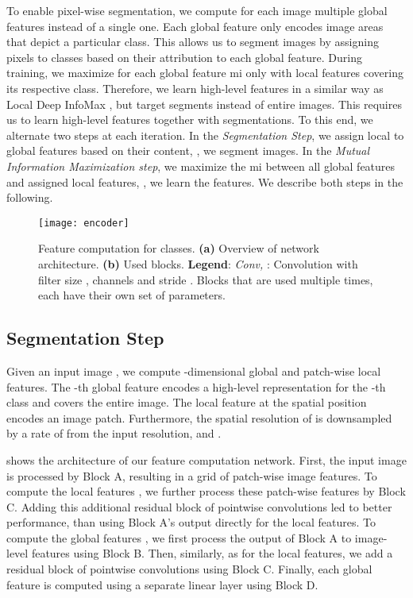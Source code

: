 To enable pixel-wise segmentation, we compute for each image multiple global features instead of a single one.
Each global feature only encodes image areas that depict a particular class.
This allows us to segment images by assigning pixels to classes based on their attribution to each global feature.
During training, we maximize for each global feature \gls{mi} only with local features covering its respective class.
Therefore, we learn high-level features in a similar way as Local Deep InfoMax \cite{deepinfo}, but target segments instead of entire images.
This requires us to learn high-level features together with segmentations.
To this end, we alternate two steps at each iteration.
In the \textit{Segmentation Step}, we assign local to global features based on their content, \ie, we segment images.
In the \textit{Mutual Information Maximization step}, we maximize the \gls{mi} between all global features and assigned local features, \ie, we learn the features.
We describe both steps in the following.





\begin{figure}[t]
	\begin{center}
	\texttt{[image: encoder]}
	\caption{Feature computation for  classes. \textbf{(a)} Overview of network architecture.
		\textbf{(b)} Used blocks. \textbf{Legend}: \textit{Conv, }: Convolution with filter size ,  channels and stride .
      Blocks that are used multiple times, each have their own set of parameters.}
	\label{fig:blocks}
	\end{center}
\end{figure}


\subsection{Segmentation Step}
\label{sec:seg}
Given an input image , we compute -dimensional global  and patch-wise local  features.
The -th global feature  encodes a high-level representation for the -th class and covers the entire image.
The local feature  at the spatial position  encodes an image patch.
Furthermore, the spatial resolution of  is downsampled by a rate of  from the input resolution, \ie  and .

 shows the architecture of our feature computation network.
First, the input image is processed by Block A, resulting in a grid of patch-wise image features.
To compute the local features , we further process these patch-wise features by Block C.
Adding this additional residual block of pointwise convolutions led to better performance, than using Block A's output directly for the local features.
To compute the global features , we first process the output of Block A to image-level features using Block B.
Then, similarly, as for the local features, we add a residual block of pointwise convolutions using Block C.
Finally, each global feature is computed using a separate linear layer using Block D.



